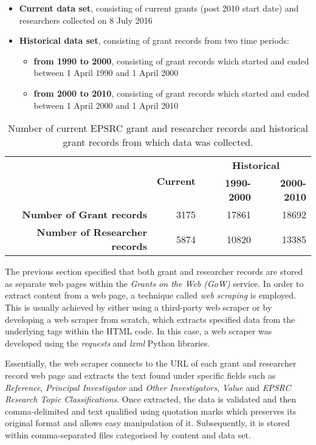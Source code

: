 \begin{itemize}[itemsep=0cm]
    \item \textbf{Current data set}, consisting of current grants (post 2010 start date) and researchers collected on 8 July 2016 
    \item \textbf{Historical data set}, consisting of grant records from two time periods:
    \begin{itemize}[itemsep=0cm]
        \item \textbf{from 1990 to 2000}, consisting of grant records which started and ended between 1 April 1990 and 1 April 2000
        \item \textbf{from 2000 to 2010}, consisting of grant records which started and ended between 1 April 2000 and 1 April 2010
    \end{itemize}
\end{itemize}

\begin{table}[!htbp]
\centering
\caption{Number of current EPSRC grant and researcher records and historical grant records from which data was collected.}
\label{table:grant_researcher_record_numbers}
\begin{tabular}{r|r|r|r}
{} & \multirow{2}{*}{\textbf{Current}}
& \multicolumn{2}{c}{\textbf{Historical}}\\
\cline{3-4}
& {} & \textbf{1990-2000} & \textbf{2000-2010}\\
\hline
\textbf{Number of Grant records}      & {3175} & {17861} & {18692}\\
\textbf{Number of Researcher records} & {5874} & {10820} & {13385}\\
\end{tabular}
\end{table}

The previous section specified that both grant and researcher records are stored as separate web pages within the \textit{Grants on the Web (GoW)} service. In order to extract content from a web page, a technique called \textit{web scraping} is employed. This is usually achieved by either using a third-party web scraper or by developing a web scraper from scratch, which extracts specified data from the underlying tags within the HTML code. In this case, a web scraper was developed using the \textit{requests} and \textit{lxml} Python libraries.

Essentially, the web scraper connects to the URL of each grant and researcher record web page and extracts the text found under specific fields such as \textit{Reference}, \textit{Principal Investigator} and \textit{Other Investigators}, \textit{Value} and \textit{EPSRC Research Topic Classifications}. Once extracted, the data is validated and then comma-delimited and text qualified using quotation marks which preserves its original format and allows easy manipulation of it. Subsequently, it is stored within comma-separated files categorised by content and data set.

